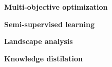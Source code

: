 {\bf Multi-objective optimization}

{\bf Semi-supervised learning}

{\bf Landscape analysis}

{\bf Knowledge distilation}





 


 




